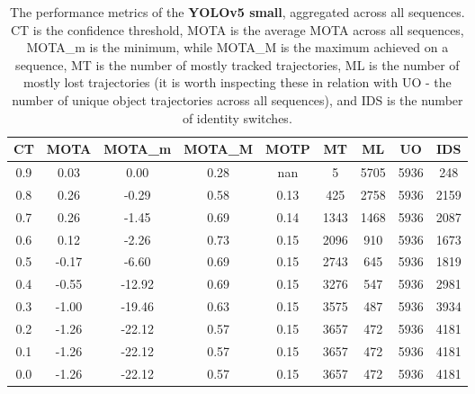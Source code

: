 \begin{table}[h]
    \centering
    \begin{tabular}{|c||c|c|c|c|c|c|c|c|}
        \hline
        CT & MOTA & MOTA\_m & MOTA\_M & MOTP & MT & ML & UO & IDS \\
        \hline
        \hline
        0.9 & 0.03 & 0.00 & 0.28 & nan & 5 & 5705 & 5936 & 248 \\
        \hline
        0.8 & 0.26 & -0.29 & 0.58 & 0.13 & 425 & 2758 & 5936 & 2159 \\
        \hline 
        0.7 & 0.26 & -1.45 & 0.69 & 0.14 & 1343 & 1468 & 5936 & 2087 \\
        \hline 
        0.6 & 0.12 & -2.26 & 0.73 & 0.15 & 2096 & 910 & 5936 & 1673 \\
        \hline 
        0.5 & -0.17 & -6.60 & 0.69 & 0.15 & 2743 & 645 & 5936 & 1819 \\
        \hline 
        0.4 & -0.55 & -12.92 & 0.69 & 0.15 & 3276 & 547 & 5936 & 2981 \\
        \hline 
        0.3 & -1.00 & -19.46 & 0.63 & 0.15 & 3575 & 487 & 5936 & 3934 \\
        \hline 
        0.2 & -1.26 & -22.12 & 0.57 & 0.15 & 3657 & 472 & 5936 & 4181 \\
        \hline 
        0.1 & -1.26 & -22.12 & 0.57 & 0.15 & 3657 & 472 & 5936 & 4181 \\
        \hline 
        0.0 & -1.26 & -22.12 & 0.57 & 0.15 & 3657 & 472 & 5936 & 4181 \\
        \hline 
    \end{tabular}
    \caption{The performance metrics of the \textbf{YOLOv5 small}, aggregated across all sequences. CT is the confidence threshold, MOTA is the average MOTA across all sequences, MOTA\_m is the minimum, while MOTA\_M is the maximum achieved on a sequence, MT is the number of mostly tracked trajectories, ML is the number of mostly lost trajectories (it is worth inspecting these in relation with UO - the number of unique object trajectories across all sequences), and IDS is the number of identity switches.}
    \label{tab:mota_ys}
\end{table}

